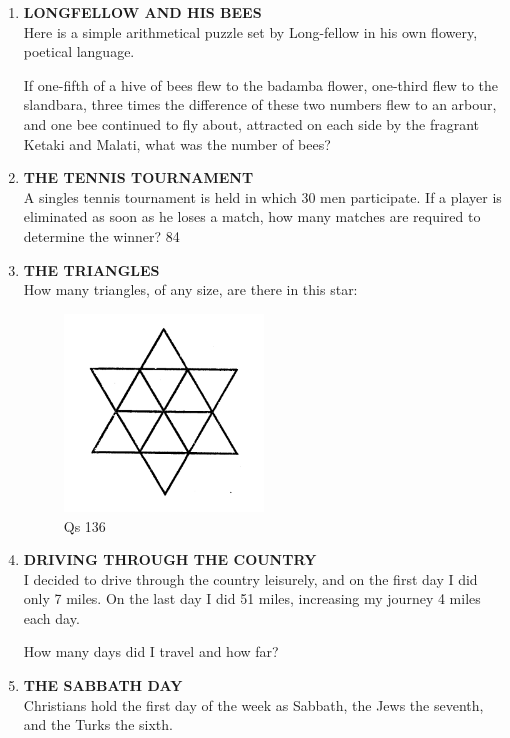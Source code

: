 \documentclass[12pt]{article}
\begin{document}
\begin{enumerate}
\item \textbf{LONGFELLOW  AND  HIS  BEES} \\
Here  is a simple  arithmetical  puzzle  set  by  Long-fellow  in his own  flowery,  poetical  language. 

If one-fifth  of a hive  of bees  flew  to the  badamba flower,  one-third  flew  to the  slandbara,  three  times  the difference  of these  two numbers  flew  to an arbour,  and one bee continued  to fly about,  attracted  on each  side  by the fragrant  Ketaki  and Malati,  what  was  the number  of bees? 


\item \textbf{THE  TENNIS  TOURNAMENT} \\
A singles  tennis  tournament  is held  in which  30 men participate.  If a player  is eliminated  as soon  as he loses a match,  how  many  matches  are  required  to determine the winner? 
84 

\item \textbf{THE  TRIANGLES} \\ 
How  many  triangles,  of any size,  are there  in this star: 
\begin{figure}[h]
\begin{center}
\includegraphics[width=0.5\textwidth]{sdevi_q136.png}
\caption{ Qs 136}
\end{center}
\end{figure}


\item \textbf{DRIVING  THROUGH  THE  COUNTRY} \\ 
I decided  to drive  through  the  country  leisurely,  and on the first  day I did only  7 miles.  On  the last day I did 51 miles,  increasing  my journey  4 miles  each  day. 

How  many  days  did I travel  and how  far? 


\item \textbf{THE  SABBATH  DAY} \\
Christians  hold  the first  day  of the  week  as Sabbath, the Jews  the seventh,  and the Turks  the sixth. 


\end{enumerate}
\end{document}
